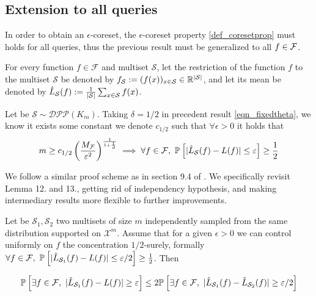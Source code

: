 \subsection{Extension to all queries}
In order to obtain an $\epsilon$-coreset, the $\epsilon$-coreset property \ref{def_coresetprop} must holds for all queries, thus the previous result must be generalized to all $f \in \mathcal{F}$.

For every function $f \in \mathcal{F}$ and multiset $\mathcal{S}$, let the restriction of the function $f$ to the multiset $\mathcal{S}$ be denoted by $f_{\mathcal{S}} := (f(x))_{x \in \mathcal{S}} \in \mathbb{R}^{|\mathcal{S} |}$, and let its mean be denoted by $\hat{L}_{\mathcal{S}}(f) := \frac{1}{|\mathcal{S}|} \sum_{x \in \mathcal{S}} f(x)$.

\begin{corollary}
	Let be $\mathcal{S} \sim  \mathcal{DPP}(K_m)$. Taking $\delta = 1/2$ in precedent result \ref{eqn_fixedtheta}, we know it exists some constant we denote $c_{1/2}$ such that $\forall \epsilon>0$ it holds that
	\begin{equation}
		m \geq c_{1/2} \left(\frac{M_{\mathcal{F}}}{\varepsilon^2} \right)^{\frac{1}{1+\frac 1 d}} \implies \forall f\in \mathcal{F},\ \mathbb{P}_{}\left[ \lvert \hat{L}_{\mathcal{S}}(f) - L(f)\rvert \leq \varepsilon\right] \geq \frac 1 2
	\end{equation} 
\end{corollary}

We follow a similar proof scheme as in section 9.4 of \cite{haussler1992decisiontheoricgeneralizationofPACmodel}. We specifically revisit Lemma 12. and 13., getting rid of independency hypothesis, and making intermediary results more flexible to further improvements.

\begin{lemma}
	Let be $\mathcal{S}_1, \mathcal{S}_2$ two multisets of size $m$ independently sampled from the same distribution supported on $\mathcal{X}^m$. Assume that for a given $\epsilon>0$ we can control uniformly on $f$ the concentration $1/2$-surely, formally $\forall f \in \mathcal{F},\ \mathbb{P}_{}\left[ \lvert \hat{L}_{\mathcal{S}_1}(f) - L(f)\rvert \leq \varepsilon/2\right] \geq \frac 1 2$. Then

   \begin{equation}
	   \PPP{}{ \exists f \in \mathcal{F},\ \lvert \estloss{\mathcal{S}_1}(\query) - \loss(\query)\rvert \geq \epsilon} \leq 2\PPP{}{\exists f \in \mathcal{F},\ \lvert \estloss{\mathcal{S}_1}(\query) - \estloss{\mathcal{S}_2}(\query) \rvert \geq \epsilon/2 }
   \end{equation}
\end{lemma}

